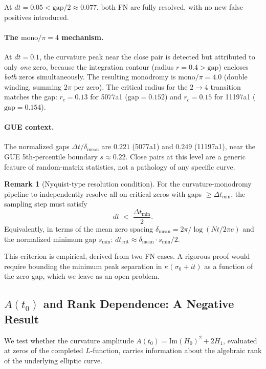 \documentclass[11pt, a4paper]{article}
\theoremstyle{plain}
\theoremstyle{definition}
\newtheorem{remark}{Remark}[section]
\begin{document}
At $dt=0.05 < \mathrm{gap}/2 \approx 0.077$, both FN are fully
resolved, with no new false positives introduced.

\paragraph{The $\mathrm{mono}/\pi=4$ mechanism.}
At $dt=0.1$, the curvature peak near the close pair is detected but
attributed to only \emph{one} zero, because the integration contour
(radius $r=0.4 > \mathrm{gap}$) encloses \emph{both} zeros
simultaneously.  The resulting monodromy is $\mathrm{mono}/\pi = 4.0$
(double winding, summing $2\pi$ per zero).  The critical radius for
the $2\to 4$ transition matches the gap: $r_{c} = 0.13$ for 5077a1
($\mathrm{gap}=0.152$) and $r_{c}=0.15$ for 11197a1
($\mathrm{gap}=0.154$).

\paragraph{GUE context.}
The normalized gaps $\Delta t/\delta_{\mathrm{mean}}$ are $0.221$
(5077a1) and $0.249$ (11197a1), near the GUE 5th-percentile boundary
$s\approx 0.22$.  Close pairs at this level are a generic feature of
random-matrix statistics, not a pathology of any specific curve.

\begin{remark}[Nyquist-type resolution condition]
\label{obs:nyquist}
For the curvature-monodromy pipeline to independently resolve all
on-critical zeros with gaps $\geq \Delta t_{\min}$, the sampling
step must satisfy
\[
  dt \;<\; \frac{\Delta t_{\min}}{2}.
\]
Equivalently, in terms of the mean zero spacing
$\delta_{\mathrm{mean}} = 2\pi/\!\log(Nt/2\pi e)$ and the
normalized minimum gap $s_{\min}$:
$dt_{\mathrm{crit}} \approx \delta_{\mathrm{mean}}\cdot s_{\min}/2$.
\end{remark}

This criterion is empirical, derived from two FN cases.  A rigorous
proof would require bounding the minimum peak separation in
$\kappa(\sigma_{0}+it)$ as a function of the zero gap, which we leave
as an open problem.


\subsection{$A(t_{0})$ and Rank Dependence: A Negative Result}
\label{ssec:arank}

We test whether the curvature amplitude $A(t_{0}) = \mathrm{Im}(H_{0})^{2}
+ 2H_{1}$, evaluated at zeros of the completed $L$-function, carries
information about the algebraic rank of the underlying elliptic curve.
\end{document}
